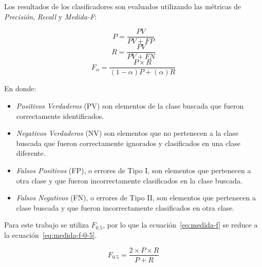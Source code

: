 \documentclass[runningheads,a4paper]{llncs}
\begin{document}
Los resultados de los clasificadores son evaluados utilizando las métricas de \emph{Precisión}, \emph{Recall} y \emph{Medida-F}\cite{BIRD09}:

\begin{equation}
	\label{eq:precision}
	P = \frac{PV}{PV + FP}
\end{equation}
\begin{equation}
	\label{eq:recall}
	R = \frac{PV}{PV + FN}
\end{equation}
\begin{equation}
	\label{eq:medida-f}
	F_{\alpha} = \frac{P \times R}{(1 - \alpha)P + (\alpha)R}
\end{equation}

En donde:
\begin{itemize}
\item{\emph{Positivos Verdaderos} (PV) son elementos de la clase buscada que fueron correctamente identificados.}
\item{\emph{Negativos Verdaderos} (NV) son elementos que no pertenecen a la clase buscada que fueron correctamente ignorados y clasificados en una clase diferente.}
\item{\emph{Falsos Positivos} (FP), o errores de Tipo I, son elementos que pertenecen a otra clase y que fueron incorrectamente clasificados en la clase buscada.}
\item{\emph{Falsos Negativos} (FN), o errores de Tipo II, son elementos que pertenecen a clase buscada y que fueron incorrectamente clasificados en otra clase.}
\end{itemize}

Para este trabajo se utiliza $F_{0.5}$\cite{MAKHOUL99}, por lo que la ecuación~\ref{eq:medida-f} se reduce a la ecuación~\ref{eq:medida-f-0-5}.

\begin{equation}
	\label{eq:medida-f-0-5}
	F_{0.5} = \frac{2 \times P \times R}{P + R}
\end{equation}


\end{document}
